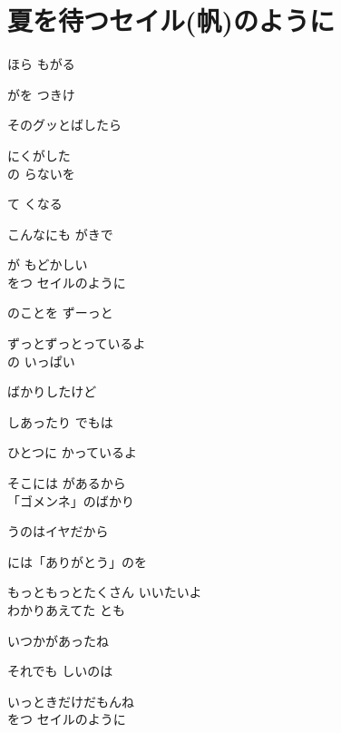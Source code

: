 \section{ 夏を待つセイル(帆)のように}
\large{

ほら もがる

がを つきけ

そのグッとばしたら

にくがした
\\

の らないを

て  くなる

こんなにも がきで

が もどかしい
\\

をつ セイルのように

のことを ずーっと

ずっとずっとっているよ
\\

の いっぱい

ばかりしたけど

しあったり でもは

ひとつに かっているよ

そこには があるから
\\

「ゴメンネ」のばかり

うのはイヤだから

には「ありがとう」のを

もっともっとたくさん いいたいよ
\\

わかりあえてた とも

いつかがあったね

それでも しいのは

いっときだけだもんね
\\

をつ セイルのように

}

